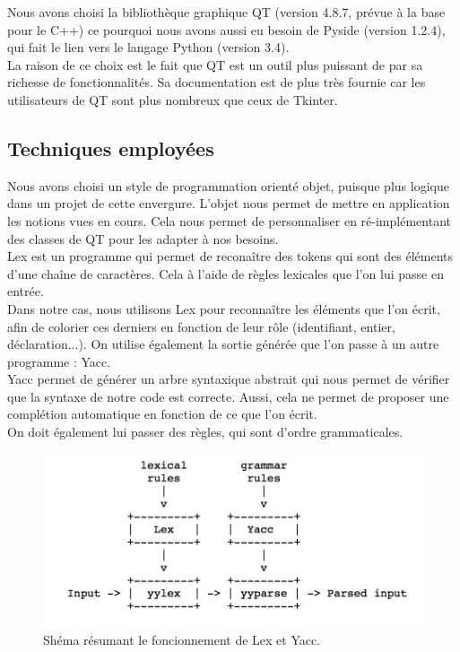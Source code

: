 \documentclass[a4paper,12pt]{article}
\begin{document}
	Nous avons choisi la bibliothèque graphique QT (version 4.8.7, prévue à la base pour le C++) ce pourquoi nous avons aussi eu besoin de Pyside (version 1.2.4), qui fait le lien vers le langage Python (version 3.4).\\
	
	La raison de ce choix est le fait que QT est un outil plus puissant de par sa richesse de fonctionnalités. Sa documentation est de plus très fournie car les utilisateurs de QT sont plus nombreux que ceux de Tkinter.
	
	\subsection{Techniques employées}
	
	Nous avons choisi un style de programmation orienté objet, puisque plus logique dans un projet de cette envergure. L'objet nous permet de mettre en application les notions vues en cours. Cela nous permet de personnaliser en ré-implémentant des classes de QT pour les adapter à nos besoins.\\
	
	Lex est un programme qui permet de reconaître des tokens qui sont des éléments d'une chaîne de caractères. Cela à l'aide de règles lexicales que l'on lui passe en entrée.\\
	Dans notre cas, nous utilisons Lex pour reconnaître les éléments que l'on écrit, afin de colorier ces derniers en fonction de leur rôle (identifiant, entier, déclaration...). On utilise également la sortie générée que l'on passe à un autre programme : Yacc.\\
	
	Yacc permet de générer un arbre syntaxique abstrait qui nous permet de vérifier que la syntaxe de notre code est correcte. Aussi, cela ne permet de proposer une complétion automatique en fonction de ce que l'on écrit.\\
	On doit également lui passer des règles, qui sont d'ordre grammaticales.
	
	\begin{figure}[h!]
		\begin{center}
			\includegraphics[scale=0.7]{images/schema_lex_yacc}
			\caption{Shéma résumant le foncionnement de Lex et Yacc.}
		\end{center}
	\end{figure}
	
\end{document}
